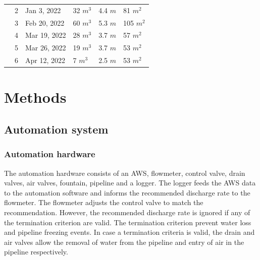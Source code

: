 \documentclass[tc, manuscript]{copernicus}
\begin{document}
\begin{table}
\begin{tabular}{@{}|llllll|@{}}
		\multicolumn{1}{|l|}{} & 2            & Jan 3, 2022   & 32 $m^{3}$      & 4.4 $m$
		                       & 81 $m^{2}$                                                                       \\
		\multicolumn{1}{|l|}{} & 3            & Feb 20, 2022   & 60 $m^{3}$      & 5.3 $m$
		                       & 105 $m^{2}$                                                                       \\
		\multicolumn{1}{|l|}{} & 4            & Mar 19, 2022   & 28 $m^{3}$      & 3.7 $m$
		                       & 57 $m^{2}$                                                                       \\
		\multicolumn{1}{|l|}{} & 5            & Mar 26, 2022   & 19 $m^{3}$      & 3.7 $m$
		                       & 53 $m^{2}$                                                                       \\
		\multicolumn{1}{|l|}{} & 6            & Apr 12, 2022   & 7 $m^{3}$      & 2.5 $m$
		                       & 53 $m^{2}$                                                                       \\
		\bottomrule
	\end{tabular}

\end{table}

\section{Methods}

\subsection{Automation system}

\subsubsection{Automation hardware}

The automation hardware consists of an AWS, flowmeter, control valve, drain valves, air valves, fountain,
pipeline and a logger. The logger feeds the AWS data to the automation software and informs the recommended
discharge rate to the flowmeter. The flowmeter adjusts the control valve to match the recommendation. However,
the recommended discharge rate is ignored if any of the termination criterion are valid. The termination
criterion prevent water loss and pipeline freezing events. In case a termination criteria is valid, the drain
and air valves allow the removal of water from the pipeline and entry of air in the pipeline respectively.
\end{document}
